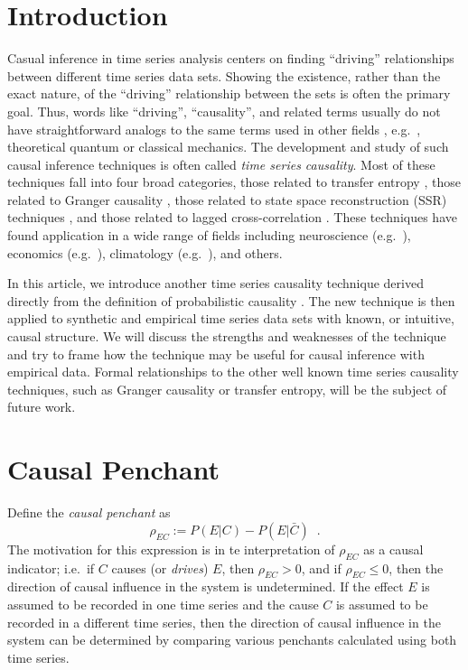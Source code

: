 \documentclass[a4paper,11pt,twocolumn]{article}
\begin{document}
\section{Introduction}
Casual inference in time series analysis centers on finding ``driving'' relationships between different time series data sets.  Showing the existence, rather than the exact nature, of the ``driving'' relationship between the sets is often the primary goal.  Thus, words like ``driving'', ``causality'', and related terms usually do not have straightforward analogs to the same terms used in other fields \cite{Granger1980,liu2012,Roberts1985}, e.g.\ , theoretical quantum or classical mechanics.  The development and study of such causal inference techniques is often called {\em time series causality}.  Most of these techniques fall into four broad categories, those related to transfer entropy \cite{Schreiber2000}, those related to Granger causality \cite{granger1969}, those related to state space reconstruction (SSR) techniques \cite{Sugihara2012}, and those related to lagged cross-correlation \cite{box2013,pascual2014}.  These techniques have found application in a wide range of fields including neuroscience (e.g.\ \cite{Kaminski2001}), economics (e.g.\ \cite{dufour1998,dufour2006}), climatology (e.g.\ \cite{mosedale2006}), and others.  

In this article, we introduce another time series causality technique derived directly from the definition of probabilistic causality \cite{}.  The new technique is then applied to synthetic and empirical time series data sets with known, or intuitive, causal structure.  We will discuss the strengths and weaknesses of the technique and try to frame how the technique may be useful for causal inference with empirical data.  Formal relationships to the other well known time series causality techniques, such as Granger causality or transfer entropy, will be the subject of future work.

\section{Causal Penchant}
Define the {\em causal penchant} as
\begin{equation}
\label{eq:pen}
\rho_{EC} := P\left(E|C\right) - P\left(E|\bar{C}\right)\;\;.
\end{equation}
The motivation for this expression is in te interpretation of $\rho_{EC}$ as a causal indicator; i.e.\ if $C$ causes (or {\em drives}) $E$, then $\rho_{EC} > 0$, and if $\rho_{EC} \le 0$, then the direction of causal influence in the system is undetermined.  If the effect $E$ is assumed to be recorded in one time series and the cause $C$ is assumed to be recorded in a different time series, then the direction of causal influence in the system can be determined by comparing various penchants calculated using both time series.  
\end{document}
